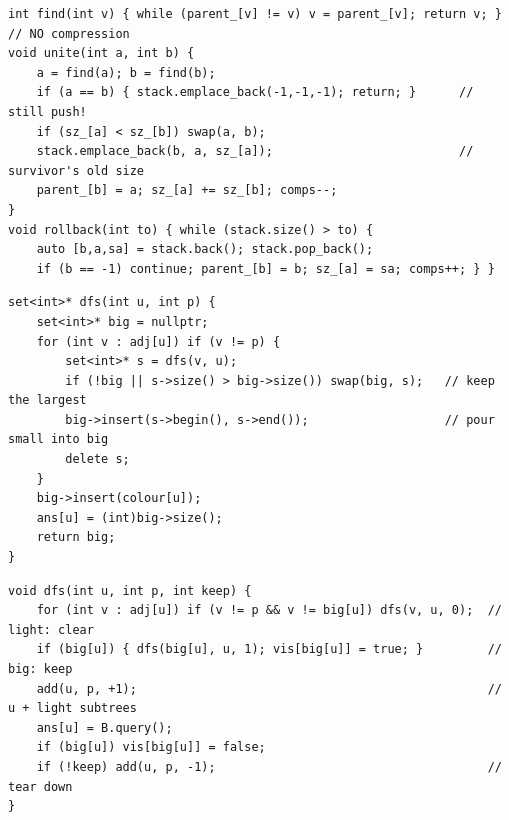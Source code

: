 \begin{lstlisting}[caption={Drill 2 -- rollback DSU core (from lst:c28-rollback)}]
int find(int v) { while (parent_[v] != v) v = parent_[v]; return v; }  // NO compression
void unite(int a, int b) {
    a = find(a); b = find(b);
    if (a == b) { stack.emplace_back(-1,-1,-1); return; }      // still push!
    if (sz_[a] < sz_[b]) swap(a, b);
    stack.emplace_back(b, a, sz_[a]);                          // survivor's old size
    parent_[b] = a; sz_[a] += sz_[b]; comps--;
}
void rollback(int to) { while (stack.size() > to) {
    auto [b,a,sa] = stack.back(); stack.pop_back();
    if (b == -1) continue; parent_[b] = b; sz_[a] = sa; comps++; } }
\end{lstlisting}

\begin{lstlisting}[caption={Drill 3 -- small-to-large merge (from lst:c28-s2l)}]
set<int>* dfs(int u, int p) {
    set<int>* big = nullptr;
    for (int v : adj[u]) if (v != p) {
        set<int>* s = dfs(v, u);
        if (!big || s->size() > big->size()) swap(big, s);   // keep the largest
        big->insert(s->begin(), s->end());                   // pour small into big
        delete s;
    }
    big->insert(colour[u]);
    ans[u] = (int)big->size();
    return big;
}
\end{lstlisting}

\begin{lstlisting}[caption={Drill 4 -- the sack schedule (from lst:c28-sack)}]
void dfs(int u, int p, int keep) {
    for (int v : adj[u]) if (v != p && v != big[u]) dfs(v, u, 0);  // light: clear
    if (big[u]) { dfs(big[u], u, 1); vis[big[u]] = true; }         // big: keep
    add(u, p, +1);                                                 // u + light subtrees
    ans[u] = B.query();
    if (big[u]) vis[big[u]] = false;
    if (!keep) add(u, p, -1);                                      // tear down
}
\end{lstlisting}

